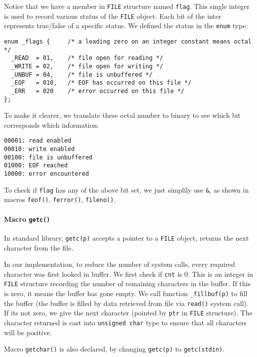 \documentclass[11pt]{article}
\begin{document}
Notice that we have a member in \texttt{FILE} structure named \texttt{flag}. This single integer is used to record various status of the \texttt{FILE} object. Each bit of the inter represents true/false of a specific status. We defined the status in the \texttt{enum} type:
\begin{verbatim}
enum _flags {     /* a leading zero on an integer constant means octal */
  _READ  = 01,    /* file open for reading */
  _WRITE = 02,    /* file open for writing */
  _UNBUF = 04,    /* file is unbuffered */
  _EOF   = 010,   /* EOF has occurred on this file */
  _ERR   = 020    /* error occurred on this file */
};
\end{verbatim}

To make it clearer, we translate these octal number to binary to see which bit corresponds which information:
\begin{Verbatim}[frame=single]
00001: read enabled
00010: write enabled
00100: file is unbuffered
01000: EOF reached
10000: error encountered
\end{Verbatim}
To check if \texttt{flag} has any of the above bit set, we just simplily use \texttt{\&}, as shown in macros \texttt{feof()}, \texttt{ferror()}, \texttt{fileno()}.

\paragraph{Macro \texttt{getc()}}
\label{sec:orgc29b131}

In standard library, \texttt{getc(p)} accepts a pointer to a \texttt{FILE} object, returns the next character from the file.

In our implementation, to reduce the number of system calls, every required character was first looked in buffer. We first check if \texttt{cnt} is 0. This is an integer in \texttt{FILE} structure recording the number of remaining characters in the buffer. If this is zero, it means the buffer has gone empty. We call function \texttt{\_fillbuf(p)} to fill the buffer (the buffer is filled by data retrieved from file via \texttt{read()} system call). If its not zero, we give the next character (pointed by \texttt{ptr} in \texttt{FILE} structure). The character returned is cast into \texttt{unsigned char} type to ensure that all characters will be positive.

Macro \texttt{getchar()} is also declared, by changing \texttt{getc(p)} to \texttt{getc(stdin)}.
\end{document}
